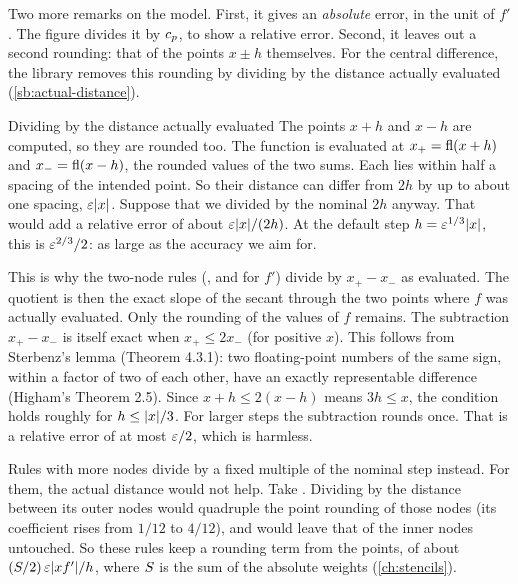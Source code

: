 Two more remarks on the model. First, it gives an \emph{absolute} error, in the unit of $f'$. The figure divides it by
$c_p$, to show a relative error. Second, it leaves out a second rounding: that of the points $x \pm h$ themselves. For
the central difference, the library removes this rounding by dividing by the distance actually evaluated
(\cref{sb:actual-distance}).

\begin{sidebar}[label=sb:actual-distance]{Dividing by the distance actually evaluated}
The points $x + h$ and $x - h$ are computed, so they are rounded too. The function is evaluated at
$x_+ = \operatorname{fl}(x + h)$ and $x_- = \operatorname{fl}(x - h)$, the rounded values of the two sums. Each lies within half a spacing of the
intended point. So their distance can differ from $2h$ by up to about one spacing, $\varepsilon \lvert x \rvert$. Suppose that we
divided by the nominal $2h$ anyway. That would add a relative error of about $\varepsilon \lvert x \rvert / (2h)$. At the
default step $h = \varepsilon^{1/3} \lvert x \rvert$, this is $\varepsilon^{2/3} / 2$: as large as the accuracy we aim for.

This is why the two-node rules (,  and  for $f'$) divide by
$x_+ - x_-$ as evaluated. The quotient is then the exact slope of the secant through the two points where $f$ was
actually evaluated. Only the rounding of the values of $f$ remains. The subtraction $x_+ - x_-$ is itself exact
when $x_+ \le 2 x_-$ (for positive $x$). This follows from Sterbenz's lemma (Theorem 4.3.1):\cite{sterbenz1974} two
floating-point numbers of the same sign, within a factor of two of each other, have an exactly representable
difference (Higham's Theorem 2.5).\cite{higham2002} Since $x + h \le 2(x - h)$ means $3h \le x$, the condition holds
roughly for $h \le \lvert x \rvert / 3$. For larger steps the subtraction rounds once. That is a relative error of at most
$\varepsilon / 2$, which is harmless.

Rules with more nodes divide by a fixed multiple of the nominal step instead. For them, the actual distance would not
help. Take . Dividing by the distance between its outer nodes would quadruple the point rounding of
those nodes (its coefficient rises from $1/12$ to $4/12$), and would leave that of the inner nodes untouched. So these
rules keep a rounding term from the points, of about
$(S / 2)\, \varepsilon \lvert x f' \rvert / h$, where $S$ is the sum of the absolute weights (\cref{ch:stencils}).
\end{sidebar}


